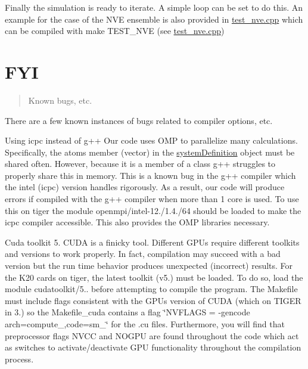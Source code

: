\begin{DoxyEnumerate}
\item Finally the simulation is ready to iterate. A simple loop can be set to do this. An example for the case of the N\-V\-E ensemble is also provided in \hyperlink{test__nve_8cpp_source}{test\-\_\-nve.\-cpp} which can be compiled with make T\-E\-S\-T\-\_\-\-N\-V\-E (see \hyperlink{test__nve_8cpp_source}{test\-\_\-nve.\-cpp})
\end{DoxyEnumerate}

\section*{F\-Y\-I}

\begin{quotation}
Known bugs, etc.

\end{quotation}


There are a few known instances of bugs related to compiler options, etc.


\begin{DoxyEnumerate}
\item Using icpc instead of g++ Our code uses O\-M\-P to parallelize many calculations. Specifically, the atoms member (vector) in the \hyperlink{classsystem_definition}{system\-Definition} object must be shared often. However, because it is a member of a class g++ struggles to properly share this in memory. This is a known bug in the g++ compiler which the intel (icpc) version handles rigorously. As a result, our code will produce errors if compiled with the g++ compiler when more than 1 core is used. To use this on tiger the module openmpi/intel-\/12./1.4./64 should be loaded to make the icpc compiler accessible. This also provides the O\-M\-P libraries necessary.
\end{DoxyEnumerate}


\begin{DoxyEnumerate}
\item Cuda toolkit 5. C\-U\-D\-A is a finicky tool. Different G\-P\-Us require different toolkits and versions to work properly. In fact, compilation may succeed with a bad version but the run time behavior produces unexpected (incorrect) results. For the K20 cards on tiger, the latest toolkit (v5.) must be loaded. To do so, load the module cudatoolkit/5.. before attempting to compile the program. The Makefile must include flags consistent with the G\-P\-Us version of C\-U\-D\-A (which on T\-I\-G\-E\-R in 3.) so the Makefile\-\_\-cuda contains a flag \char`\"{}\-N\-V\-F\-L\-A\-G\-S = -\/gencode arch=compute\-\_,code=sm\-\_\char`\"{} for the .cu files. Furthermore, you will find that preprocessor flags N\-V\-C\-C and N\-O\-G\-P\-U are found throughout the code which act as switches to activate/deactivate G\-P\-U functionality throughout the compilation process.
\end{DoxyEnumerate}


